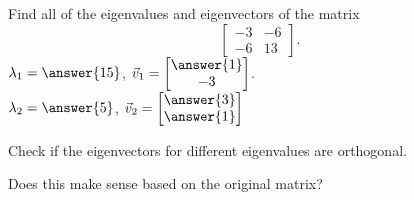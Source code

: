 \documentclass{ximera}
\begin{document}
\begin{exercise}
    Find all of the eigenvalues and eigenvectors of the matrix
    \[ 
        \begin{bmatrix}
            -3 & -6 \\ 
            -6 & 13 
        \end{bmatrix}. 
    \]
    $\lambda_1 = \answer{15}$, $\vec{v}_1 = \begin{bmatrix} \answer{1} \\ -3 \end{bmatrix}$. \\
    $\lambda_2 = \answer{5}$, $\vec{v}_2 = \begin{bmatrix} \answer{3}\\ \answer{1} \end{bmatrix}$
    \begin{problem}
        Check if the eigenvectors for different eigenvalues are orthogonal. 
        \begin{multipleChoice}
        \end{multipleChoice}
        \begin{problem}
            Does this make sense based on the original matrix? 
        \end{problem}
    \end{problem}
\end{exercise}
\end{document}
